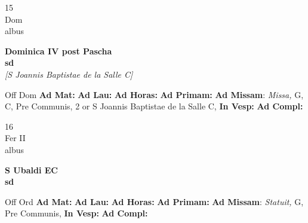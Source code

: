 \documentclass[10pt, openany]{book}
\begin{document}
    \begin{center}
        \begin{minipage}{3.5in}
            \vspace{2em}
            \begin{minipage}{0.5in}
                {\Huge 15} \\
                {\normalsize Dom} \\
                {\normalsize albus}
            \end{minipage}
            \begin{minipage}{3.0in}
                \textbf{ \large Dominica IV post Pascha \\
                \textnormal{\normalsize sd}} \\ \textit{[S Joannis Baptistae de la Salle C]} \\ 
            \end{minipage}
            \begin{justify}Off Dom
                \textbf{Ad Mat: }
                \textbf{Ad Lau: }
                \textbf{Ad Horas: }
                \textbf{Ad Primam: }\textbf{Ad Missam}: \textit{Missa,} G, C, Pre Communis, 2 or S Joannis Baptistae de la Salle C,  
                \textbf{In Vesp: }
                \textbf{Ad Compl: }
            \end{justify}
        \end{minipage}
    \end{center}

    \begin{center}
        \begin{minipage}{3.5in}
            \vspace{2em}
            \begin{minipage}{0.5in}
                {\Huge 16} \\
                {\normalsize Fer II} \\
                {\normalsize albus}
            \end{minipage}
            \begin{minipage}{3.0in}
                \textbf{ \large S Ubaldi EC \\
                \textnormal{\normalsize sd}} \\ 
            \end{minipage}
            \begin{justify}Off Ord
                \textbf{Ad Mat: }
                \textbf{Ad Lau: }
                \textbf{Ad Horas: }
                \textbf{Ad Primam: }\textbf{Ad Missam}: \textit{Statuit,} G, Pre Communis,  
                \textbf{In Vesp: }
                \textbf{Ad Compl: }
            \end{justify}
        \end{minipage}
    \end{center}
\end{document}
